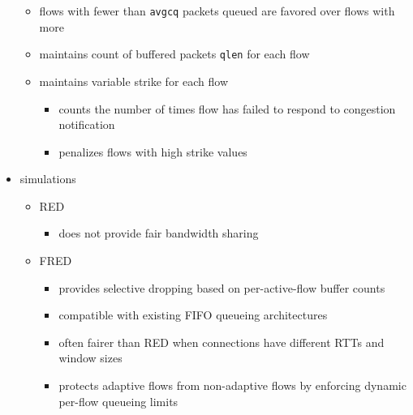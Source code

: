 \begin{itemize}
\begin{itemize}
\begin{itemize}
        \end{itemize}
        \item flows with fewer than \texttt{avgcq} packets queued are favored
        over flows with more
        \item maintains count of buffered packets \texttt{qlen} for each flow
        \item maintains variable strike for each flow
        \begin{itemize}
            \item counts the number of times flow has failed to respond to
            congestion notification
            \item penalizes flows with high strike values
        \end{itemize}
    \end{itemize}
    \item simulations
    \begin{itemize}
        \item RED
        \begin{itemize}
            \item does not provide fair bandwidth sharing
        \end{itemize}
        \item FRED
        \begin{itemize}
            \item provides selective dropping based on per-active-flow buffer counts
            \item compatible with existing FIFO queueing architectures
            \item often fairer than RED when connections have different RTTs and
            window sizes
            \item protects adaptive flows from non-adaptive flows by enforcing
            dynamic per-flow queueing limits
        \end{itemize}
    \end{itemize}
\end{itemize}